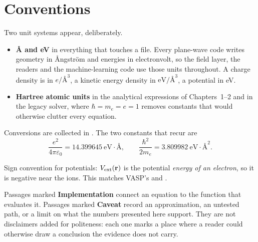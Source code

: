 \section*{Conventions}

Two unit systems appear, deliberately.

\begin{itemize}
  \item \textbf{Å and eV} in everything that touches a file. Every plane-wave
    code writes geometry in Ångström and energies in electronvolt, so the field
    layer, the readers and the machine-learning code use those units
    throughout. A charge density is in $e/\text{\AA}^3$, a kinetic energy
    density in $\mathrm{eV}/\text{\AA}^3$, a potential in eV.
  \item \textbf{Hartree atomic units} in the analytical expressions of
    Chapters~1--2 and in the legacy solver, where $\hbar = m_e = e = 1$ removes
    constants that would otherwise clutter every equation.
\end{itemize}

Conversions are collected in . The two
constants that recur are
\[
  \frac{e^2}{4\pi\varepsilon_0} = 14.399645\ \mathrm{eV}\cdot\text{\AA},
  \qquad
  \frac{\hbar^2}{2m_e} = 3.809982\ \mathrm{eV}\cdot\text{\AA}^2 .
\]

Sign convention for potentials: $V_{\mathrm{ext}}(\mathbf{r})$ is the potential \emph{energy of an
electron}, so it is negative near the ions. This matches VASP's 
and .

\begin{pnote}
Passages marked \textbf{Implementation} connect an equation to the function
that evaluates it. Passages marked \textbf{Caveat} record an approximation, an
untested path, or a limit on what the numbers presented here support. They are
not disclaimers added for politeness: each one marks a place where a reader
could otherwise draw a conclusion the evidence does not carry.
\end{pnote}
